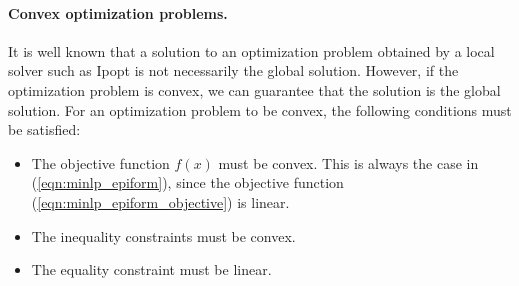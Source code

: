 \paragraph{Convex optimization problems.}
It is well known that a solution to an optimization problem obtained by a local solver such as Ipopt is not necessarily the global solution. However, if the optimization problem is convex, we can guarantee that the solution is the global solution. For an optimization problem to be convex, the following conditions must be satisfied:
\begin{itemize}
\item
The objective function $f(x)$ must be convex. This is always the case in (\ref{eqn:minlp_epiform}), since the objective function (\ref{eqn:minlp_epiform_objective}) is linear.
\item
The inequality constraints must be convex.
\item
The equality constraint must be linear.
\end{itemize}
